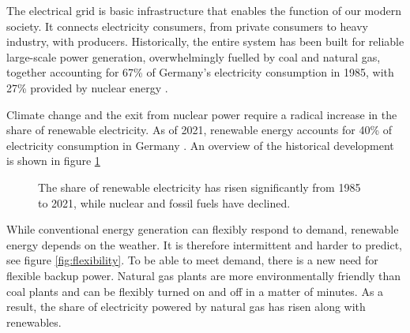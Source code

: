 The electrical grid is basic infrastructure that enables the function of our modern society.
It connects electricity consumers, from private consumers to heavy industry, with producers.
Historically, the entire system has been built for reliable large-scale power generation, overwhelmingly fuelled by coal and natural gas, together accounting for 67\% of Germany's electricity consumption in 1985, with 27\% provided by nuclear energy \cite{ritchie2022Energy}.

Climate change and the exit from nuclear power require a radical increase in the share of renewable electricity. As of 2021, renewable energy accounts for 40\% of electricity consumption in Germany \cite{ritchie2022Energy}.
An overview of the historical development is shown in figure \ref{fig:electricity_mix}

\begin{figure}
    \centering
    \caption{The share of renewable electricity has risen significantly from 1985 to 2021, while nuclear and fossil fuels have declined.}
    \label{fig:electricity_mix}
\end{figure}

While conventional energy generation can flexibly respond to demand, renewable energy depends on the weather.
It is therefore intermittent and harder to predict, see figure \ref{fig:flexibility}. To be able to meet demand, there is a new need for flexible backup power.
Natural gas plants are more environmentally friendly than coal plants and can be flexibly turned on and off in a matter of minutes.
As a result, the share of electricity powered by natural gas has risen along with renewables.

